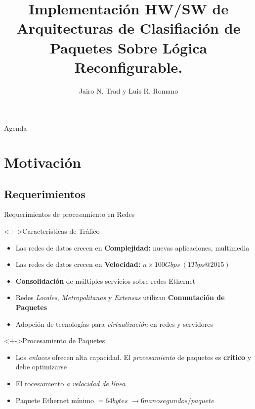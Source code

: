 \documentclass[xcolor=dvipsnames]{beamer}
\title[] {Implementación HW/SW de Arquitecturas de Clasifiación de Paquetes Sobre Lógica Reconfigurable.}
\author[] {Jairo N. Trad y Luis R. Romano}
\institute[Universidades] %
{
  \scriptsize Laboratorio de Comunicaciones Digitales \\
  \scriptsize Universidad Nacional de Córdoba, Facultad Ciencias Exactas, Físicas y Naturales \\ 
}
\begin{document}
\begin{frame}
  \titlepage
\end{frame}

\begin{frame}{Agenda}
  \tableofcontents
\end{frame}

\scriptsize

\section{Motivación}

\subsection{Requerimientos}

\begin{frame}{Requerimientos de procesamiento en Redes}
  \scriptsize
  
  \begin{block}<+->{Características de Tráfico}

    \begin{itemize}
      \item Las redes de datos crecen en {\bf Complejidad:} nuevas aplicaciones, multimedia

      \item Las redes de datos crecen en {\bf Velocidad:} $n \times 100 Gbps\ (1Tbps@2015)$

      \item {\bf Consolidación} de múltiples servicios sobre redes Ethernet
      
      \item Redes \emph{Locales}, \emph{Metropolitanas} y \emph{Extensas} utilizan {\bf Conmutación de Paquetes}

      \item Adopción de tecnologías para \emph{virtualización} en redes y servidores
    \end{itemize}
    
  \end{block}
    
  \begin{block}<+->{Procesamiento de Paquetes}
    \begin{itemize}

      \item Los \emph{enlaces} ofrecen alta capacidad. El \emph{procesamiento} de paquetes es {\bf crítico} y debe optimizarse

      \item El rocesamiento \emph{a velocidad de línea}

      \item Paquete Ethernet mínimo $=64 bytes$ $\rightarrow 6 nanosegundos/paquete$  
    \end{itemize}    
  \end{block}

\end{frame}
\end{document}
